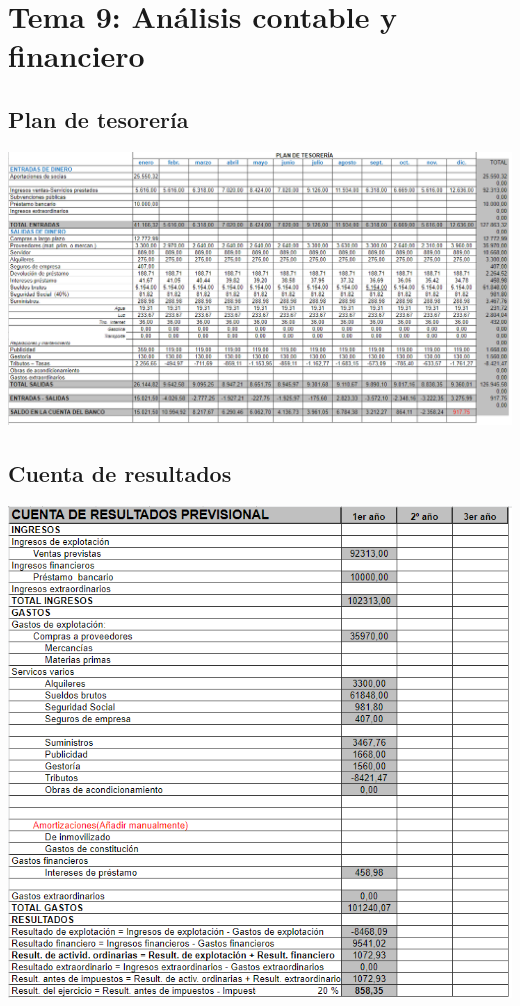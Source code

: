 \documentclass[openany,overnay,a4paper, twoside, 12pt]{book}
\begin{document}
\chapter*{Tema 9: Análisis contable y financiero}
\section{Plan de tesorería}
\includegraphics[scale = 0.53]{planTesoreria.png}


\section{Cuenta de resultados}
\includegraphics[scale = 0.65]{cuentaResultados.png}
\end{document}
